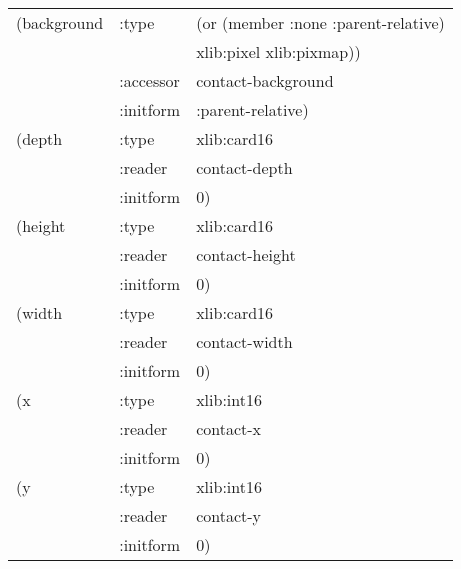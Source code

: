\documentclass[twoside]{book}
\begin{document}
\begin{sloppy}
\begin{flushright}
{\begin{tabular}{lll}
   (background & :type & (or (member :none :parent-relative) \\
                       &       & xlib:pixel xlib:pixmap)) \\
&                        :accessor & contact-background \\
&                        :initform & :parent-relative) \\
   (depth &              :type & xlib:card16 \\
&                        :reader & contact-depth \\
&                        :initform & 0) \\
   (height &             :type & xlib:card16 \\
&                        :reader & contact-height \\
&                        :initform & 0) \\
   (width &              :type & xlib:card16 \\
&                        :reader & contact-width \\
&                        :initform & 0) \\
   (x &                  :type & xlib:int16 \\
&                        :reader & contact-x \\
&                        :initform & 0) \\
   (y &                  :type & xlib:int16 \\
&                        :reader & contact-y \\
&                        :initform & 0)  
\end{tabular}}


\end{flushright}
\end{sloppy}
\end{document}
